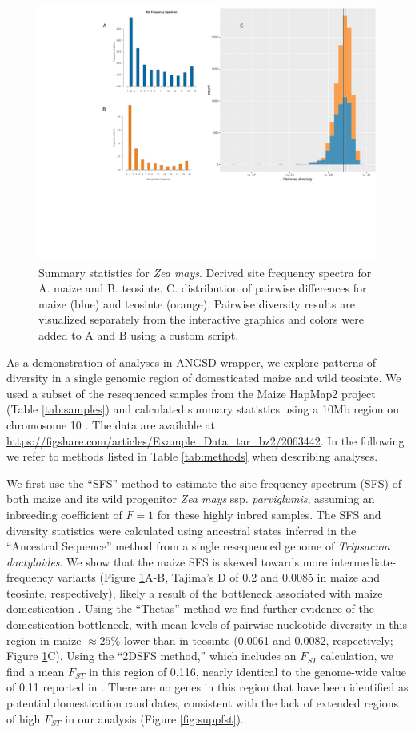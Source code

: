 \documentclass[10pt,a4paper]{article}
\newcommand{\jri}[1]{\todo[size=\scriptsize, color=flame]{#1}}
\newcommand{\fst}{${F_{ST}}$ }
\begin{document}
\begin{figure}
\centering
\includegraphics[width=0.8\linewidth]{figures/figure3big.pdf}
\caption{Summary statistics for {\it Zea mays}. Derived site frequency spectra for A. maize and B. teosinte. C. distribution of pairwise differences for maize (blue) and teosinte (orange). Pairwise diversity results are visualized separately from the interactive graphics and colors were added to A and B using a custom script.}
\label{fig:figure3}
\end{figure}
\jri{figure says "spectrum" should be plural}
As a demonstration of analyses in ANGSD-wrapper, we explore patterns of diversity in a single genomic region of domesticated maize and wild teosinte. 
We used a subset of the resequenced samples from the Maize HapMap2 project (Table \ref{tab:samples}) and calculated summary statistics using a 10Mb region on chromosome 10 \citep{chia2012maize}. 
The data are available at \url{https://figshare.com/articles/Example_Data_tar_bz2/2063442}. 
In the following we refer to methods listed in Table \ref{tab:methods} when describing analyses.

We first use the ``SFS'' method to estimate the site frequency spectrum (SFS) of both maize and its wild progenitor \textit{Zea mays} ssp. \textit{parviglumis}, assuming an inbreeding coefficient of $F=1$ for these highly inbred samples. 
The SFS and diversity statistics were calculated using ancestral states inferred in the ``Ancestral Sequence'' method from a single resequenced genome of \textit{Tripsacum dactyloides}.  
We show that the maize SFS is skewed towards more intermediate-frequency variants (Figure \ref{fig:figure3}A-B, Tajima's D of 0.2 and 0.0085 in maize and teosinte, respectively), likely a result of the bottleneck associated with maize domestication \citep{eyre1998investigation, Beissinger031666}.
Using the ``Thetas'' method we find further evidence of the domestication bottleneck, with mean levels of pairwise nucleotide diversity in this region in maize $\approx 25\%$ lower than in teosinte (0.0061 and 0.0082, respectively; Figure \ref{fig:figure3}C). 
Using the ``2DSFS method,'' which includes an \fst calculation, we find a mean \fst in this region of 0.116, nearly identical to the  genome-wide value of 0.11 reported in \cite{hufford2012comparative}.   
There are no genes in this region that have  been identified as potential domestication candidates, consistent with the lack of extended regions of high \fst in our analysis (Figure \ref{fig:suppfst}).
\end{document}
